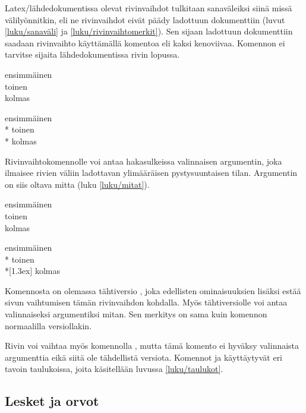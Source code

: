Latex\-/lähdedokumentissa olevat rivinvaihdot tulkitaan sanaväleiksi
siinä missä välilyönnitkin, eli ne rivinvaihdot eivät päädy ladottuun
dokumenttiin (luvut \ref{luku/sanaväli} ja
\ref{luku/rivinvaihtomerkit}). Sen sijaan ladottuun dokumenttiin saadaan
rivinvaihto käyttämällä komentoa \komentom{\keno} eli kaksi kenoviivaa.
Komennon ei tarvitse sijaita lähdedokumentissa rivin lopussa.

\komentoi{\keno}
\begin{koodilohkosis}
ensimmäinen \\ toinen \\
kolmas
\end{koodilohkosis}

\begin{tulossis}
  ensimmäinen \\* toinen \\* kolmas
\end{tulossis}

Rivinvaihtokomennolle voi antaa hakasulkeissa valinnaisen argumentin,
joka ilmaisee rivien väliin ladottavan ylimääräisen pystysuuntaisen
tilan. Argumentin on siis oltava mitta (luku \ref{luku/mitat}).

\komentoi{\keno}
\begin{koodilohkosis}
ensimmäinen \\ toinen \\[1.3ex] kolmas
\end{koodilohkosis}

\begin{tulossis}
  ensimmäinen \\* toinen \\*[1.3ex] kolmas
\end{tulossis}

Komennosta on olemassa tähtiversio \komentom{\keno *}, joka edellisten
ominaisuuksien lisäksi estää sivun vaihtumisen tämän rivinvaihdon
kohdalla. Myös tähtiversiolle voi antaa valinnaiseksi argumentiksi
mitan. Sen merkitys on sama kuin komennon normaalilla versiollakin.

Rivin voi vaihtaa myös komennolla , mutta tämä komento
ei hyväksy valinnaista argumenttia eikä siitä ole tähdellistä versiota.
Komennot  ja \komento{\keno} käyttäytyvät eri tavoin
taulukoissa, joita käsitellään luvussa \ref{luku/taulukot}.

\subsection{Lesket ja orvot}

